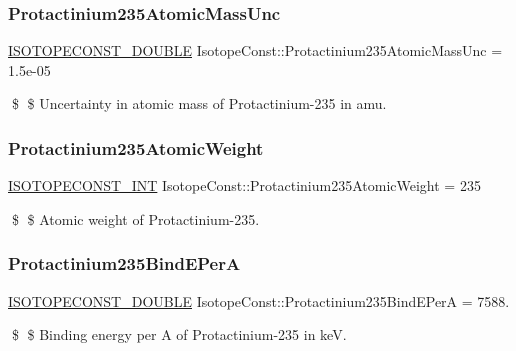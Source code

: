 \subsubsection{\texorpdfstring{Protactinium235\+Atomic\+Mass\+Unc}{Protactinium235AtomicMassUnc}}
{\footnotesize\ttfamily \mbox{\hyperlink{group___isotope_const-_macros_ga8f45a7272ce02c0b4c65c44636ed719a}{I\+S\+O\+T\+O\+P\+E\+C\+O\+N\+S\+T\+\_\+\+D\+O\+U\+B\+LE}} Isotope\+Const\+::\+Protactinium235\+Atomic\+Mass\+Unc = 1.\+5e-\/05}

\$ \$ Uncertainty in atomic mass of Protactinium-\/235 in amu. \mbox{\label{group___isotope_const-_protactinium-_pa235_gaabfd10f802b027275f79bfafc2bd5424}} 
\subsubsection{\texorpdfstring{Protactinium235\+Atomic\+Weight}{Protactinium235AtomicWeight}}
{\footnotesize\ttfamily \mbox{\hyperlink{group___isotope_const-_macros_ga5f18360b3e99483a35c32d789e62621c}{I\+S\+O\+T\+O\+P\+E\+C\+O\+N\+S\+T\+\_\+\+I\+NT}} Isotope\+Const\+::\+Protactinium235\+Atomic\+Weight = 235}

\$ \$ Atomic weight of Protactinium-\/235. \mbox{\label{group___isotope_const-_protactinium-_pa235_ga02c5420a6e8907cf96b3507ca16e9a85}} 
\subsubsection{\texorpdfstring{Protactinium235\+Bind\+E\+PerA}{Protactinium235BindEPerA}}
{\footnotesize\ttfamily \mbox{\hyperlink{group___isotope_const-_macros_ga8f45a7272ce02c0b4c65c44636ed719a}{I\+S\+O\+T\+O\+P\+E\+C\+O\+N\+S\+T\+\_\+\+D\+O\+U\+B\+LE}} Isotope\+Const\+::\+Protactinium235\+Bind\+E\+PerA = 7588.}

\$ \$ Binding energy per A of Protactinium-\/235 in keV. \mbox{\label{group___isotope_const-_protactinium-_pa235_ga9e180110b9916504c4cc099ce9dbc247}} 

